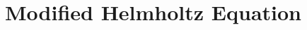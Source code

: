 \documentclass[11pt,a4paper]{article}
\begin{document}
\section{Modified Helmholtz Equation}


































\end{document}
